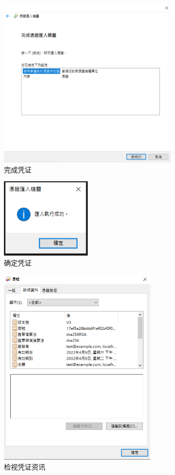 \begin{figure}[htb]
\centering 
\includegraphics[width=0.80\textwidth]{img/ch1s2m11.png} 
\caption{完成凭证}
\label{Test}
\end{figure}

\begin{figure}[htb]
\centering 
\includegraphics[width=0.40\textwidth]{img/ch1s2m12.png} 
\caption{确定凭证}
\label{Test}
\end{figure}

\begin{figure}[htb]
\centering 
\includegraphics[width=0.70\textwidth]{img/ch1s2m13.png} 
\caption{检视凭证资讯}
\label{Test}
\end{figure}

